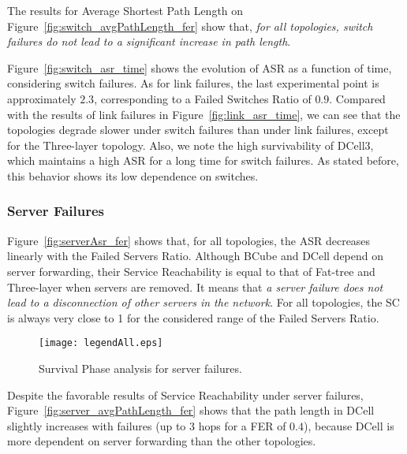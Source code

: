 The results for Average Shortest Path Length on Figure~\ref{fig:switch_avgPathLength_fer} show that, \textit{for all topologies, switch failures do not lead to a significant increase in path length}.

Figure~\ref{fig:switch_asr_time} shows the evolution of ASR as a function of time, considering switch failures. As for link failures, the last experimental point is approximately $2.3$, corresponding to a Failed Switches Ratio of $0.9$. Compared with the results of link failures in Figure~\ref{fig:link_asr_time}, we can see that the topologies degrade slower under switch failures than under link failures, except for the Three-layer topology. Also, we note the high survivability of DCell3, which maintains a high ASR for a long time for switch failures. As stated before, this behavior shows its low dependence on switches.

\subsubsection{Server Failures}
\label{sec:perfEvaluationServerSurvival}

Figure~\ref{fig:serverAsr_fer} shows that, for all topologies, the ASR decreases linearly with the Failed Servers Ratio. Although BCube and DCell depend on server forwarding, their Service Reachability is equal to that of Fat-tree and Three-layer when servers are removed. It means that \textit{a server failure does not lead to a disconnection of other servers in the network}. For all topologies, the SC is always very close to 1 for the considered range of the Failed Servers Ratio.
\begin{figure}
\centering
{}
{\texttt{[image: legendAll.eps]}}
\caption{Survival Phase analysis for server failures.}
\end{figure}

Despite the favorable results of Service Reachability under server failures, Figure~\ref{fig:server_avgPathLength_fer} shows that the path length in DCell slightly increases with failures (up to 3 hops for a FER of $0.4$), because DCell is more dependent on server forwarding than the other topologies. 

